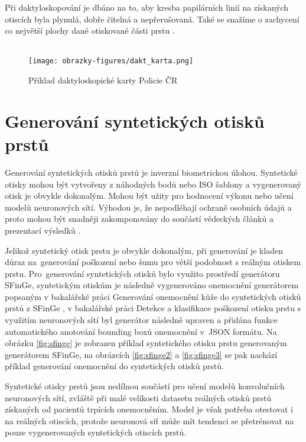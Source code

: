 Při daktyloskopování je dbáno na to, aby kresba papilárních linií na získaných otiscích byla plynulá, dobře čitelná a nepřerušovaná. Také se snažíme o zachycení co největší plochy dané otiskované části prstu \cite{BIOdaktylLecture}.\\\\

\begin{figure}[!htbp]
    \centering
    \texttt{[image: obrazky-figures/dakt\_karta.png]}
    \caption{Příklad daktyloskopické karty Policie ČR \cite{BIOdaktylLecture}}
    \label{fig:dakty}
\end{figure}

\section{Generování syntetických otisků prstů}
Generování syntetických otisků prstů je inverzní biometrickou úlohou. Syntetické otisky mohou být vytvořeny z náhodných bodů nebo ISO šablony a vygenerovaný otisk je obvykle dokonalým. Mohou být užity pro hodnocení výkonu nebo učení modelů neuronových sítí. Výhodou je, že nepodléhají ochraně osobních údajů a proto mohou být snadněji zakomponovány do součástí vědeckých článků a prezentací výsledků \cite{BIOotiskyLecture}.

Jelikož syntetický otisk prstu je obvykle dokonalým, při generování je kladen důraz na~generování poškození nebo šumu pro větší podobnost s reálným otiskem prstu. Pro~generování syntetických otisků bylo využito prostředí generátoru SFinGe, syntetickým otiskům je následně vygenerováno onemocnění generátorem popsaným v bakalářské práci Generování onemocnění kůže do syntetických otisků prstů z
SFinGe \cite{FITBT21893}, v bakalářské práci Detekce a klasifikace poškození otisku prstu s využitím neuronových sítí \cite{FITBT22567} byl generátor následně upraven a přidána funkce automatického anotování bounding boxů onemocnění v~JSON formátu. Na obrázku \ref{fig:sfinge} je zobrazen příklad syntetického otisku prstu generovaným generátorem SFinGe, na obrázcích \ref{fig:sfinge2} a \ref{fig:sfinge3} se pak nachází příklad generování onemocnění do syntetických otisků prstů.

Syntetické otisky prstů jsou nedílnou součástí pro učení modelů konvolučních neuronových sítí, zvláště při malé velikosti datasetu reálných otisků prstů získaných od pacientů trpících onemocněním. Model je však potřeba otestovat i na reálných otiscích, protože neuronová síť může mít tendenci se přetrénovat na pouze vygenerovaných syntetických otiscích prstů.

